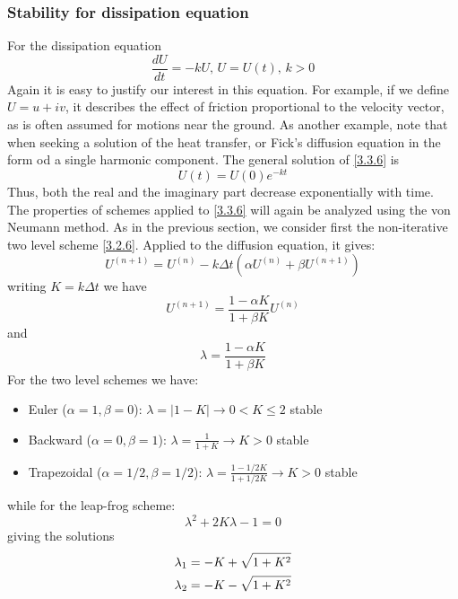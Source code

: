 \subsubsection{Stability for dissipation equation}
For the dissipation equation 
\begin{equation}\label{3.3.6}
    \frac{dU}{dt}=-kU \text{,} \,\, U=U(t)\text{,} \,\, k>0
\end{equation}
Again it is easy to justify our interest in this equation. For example, if we define $U=u+iv$, it describes the effect of friction proportional to the velocity vector, as is often assumed for motions near the ground. As another example, note that when seeking a solution of the heat transfer, or Fick’s diffusion equation in the form od a single harmonic component. 
The general solution of \ref{3.3.6} is 
\begin{equation}
    U(t)=U(0)e^{-kt}
\end{equation}
Thus, both the real and the imaginary part decrease exponentially with time. 
The properties of schemes applied to \ref{3.3.6} will again be analyzed using the von Neumann method. As in the previous section, we consider first the non-iterative two level scheme \ref{3.2.6}. Applied to the diffusion equation, it gives:
\begin{equation}\label{3.3.8}
    U^{(n+1)}=U^{(n)}-k\Delta t\left(\alpha U^{(n)}+\beta U^{(n+1)}\right)
\end{equation}
writing $K=k\Delta t$ we have
\begin{equation}\label{3.3.10}
    U^{(n+1)}=\frac{1-\alpha K}{1+\beta K}U^{(n)}
\end{equation}
and 
\begin{equation}
    \lambda=\frac{1-\alpha K}{1+\beta K}
\end{equation}
For the two level schemes we have:
\begin{itemize}
    \item Euler ($\alpha=1, \beta=0$): $\lambda=|1-K|\rightarrow0<K\leq2$ stable
    \item Backward ($\alpha=0, \beta=1$): $\lambda=\frac{1}{1+K}\rightarrow K>0$ stable
    \item Trapezoidal ($\alpha=1/2, \beta=1/2$): $\lambda=\frac{1-1/2K}{1+1/2K}\rightarrow K>0$ stable
\end{itemize}
while for the leap-frog scheme:
$$\lambda^2+2K\lambda-1=0$$
giving the solutions
\begin{align}
    \lambda_1=-K+\sqrt{1+K^2} \\
    \lambda_2=-K-\sqrt{1+K^2}\notag
\end{align}
